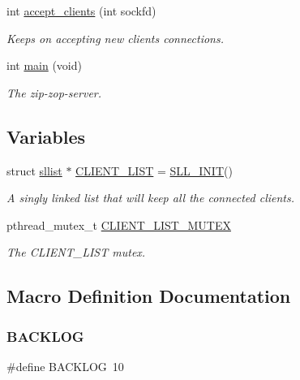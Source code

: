 \begin{DoxyCompactItemize}
int \hyperlink{zip-zop-server_8c_acd1dc66d1afd8edcd165dc3f6855d355}{accept\+\_\+clients} (int sockfd)
\begin{DoxyCompactList}\small\item\em Keeps on accepting new clients connections. \end{DoxyCompactList}\item 
int \hyperlink{zip-zop-server_8c_a840291bc02cba5474a4cb46a9b9566fe}{main} (void)
\begin{DoxyCompactList}\small\item\em The zip-\/zop-\/server. \end{DoxyCompactList}\end{DoxyCompactItemize}
\subsection*{Variables}
\begin{DoxyCompactItemize}
\item 
struct \hyperlink{structsllist}{sllist} $\ast$ \hyperlink{zip-zop-server_8c_a32076dcdfaf1057a014d74d01cc7e08e}{C\+L\+I\+E\+N\+T\+\_\+\+L\+I\+ST} = \hyperlink{sllist_8h_a4f1348bb9eb6fe8c2b112e39c1887290}{S\+L\+L\+\_\+\+I\+N\+IT}()
\begin{DoxyCompactList}\small\item\em A singly linked list that will keep all the connected clients. \end{DoxyCompactList}\item 
pthread\+\_\+mutex\+\_\+t \hyperlink{zip-zop-server_8c_ac58873310e66c9bfafdbc798a8a7c7e2}{C\+L\+I\+E\+N\+T\+\_\+\+L\+I\+S\+T\+\_\+\+M\+U\+T\+EX}
\begin{DoxyCompactList}\small\item\em The {\ttfamily C\+L\+I\+E\+N\+T\+\_\+\+L\+I\+ST} mutex. \end{DoxyCompactList}\end{DoxyCompactItemize}


\subsection{Macro Definition Documentation}
\mbox{\label{zip-zop-server_8c_aeefbbafa97642defe3ee6c3080b7d66f}} 
\subsubsection{\texorpdfstring{B\+A\+C\+K\+L\+OG}{BACKLOG}}
{\footnotesize\ttfamily \#define B\+A\+C\+K\+L\+OG~10}



